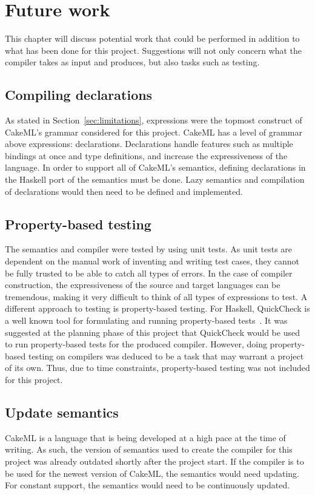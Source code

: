 \chapter{Future work}

This chapter will discuss potential work that could be performed in
addition to what has been done for this project. Suggestions will not only
concern what the compiler takes as input and produces, but also tasks such as
testing.

\section{Compiling declarations}
As stated in Section~\ref{sec:limitations}, expressions were the topmost
construct of CakeML's grammar considered for this project. CakeML has a level
of grammar above expressions: declarations. Declarations handle
features such as multiple
bindings at once and type definitions, and increase the expressiveness of the
language. In order to support all of CakeML's semantics, defining declarations
in the Haskell port of the semantics must be done. Lazy semantics and
compilation of declarations would then need to be defined and implemented.

\section{Property-based testing}
The semantics and compiler were tested by using unit tests.
As unit tests are dependent on the manual work of inventing and writing
test cases, they cannot be fully trusted to be able to catch all types of
errors. In the case of compiler construction, the expressiveness of the
source and target languages can be tremendous, making it very difficult to
think of all types of expressions to test. A different approach to testing
is property-based testing. For Haskell, QuickCheck is a well known tool for
formulating and running property-based
tests~\cite{Claessen:2000:QLT:351240.351266}.
It was suggested at the planning phase of this project that QuickCheck would
be used to run property-based tests for the produced compiler. However, doing
property-based testing on compilers was deduced to be a task that may warrant
a project of its own. Thus, due to time constraints, property-based testing
was not included for this project.

\section{Update semantics}
CakeML is a language that is being developed at a high pace at the time of
writing. As such, the version of semantics used to create the compiler for this
project was already outdated shortly after the project start. If the compiler
is to be used for the newest version of CakeML, the semantics would need
updating. For constant support, the semantics would need to be continuously
updated.


